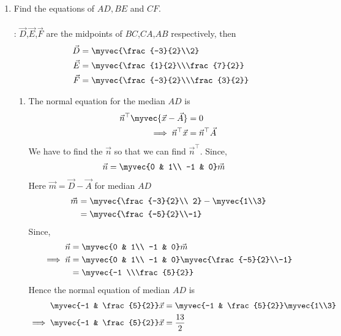 \documentclass[11pt]{book}
\begin{document}
\begin{enumerate}[label=\thesection.\arabic*.,ref=\thesection.\theenumi]
\item Find the equations of $AD, BE$ and $CF$.\\
\\ \solution:
$\vec{D}$,$\vec{E}$,$\vec{F}$ are the midpoints of $BC$,$CA$,$AB$ respectively, then\\
\begin{align}
 \vec{D} &=  \myvec{\frac{-3}{2}\\2}\\
\vec{E} &=  \myvec{\frac{1}{2}\\\frac{7}{2}}\\
 \vec{F} &=  \myvec{\frac{-3}{2}\\\frac{3}{2}}\\
\end{align}
\begin{enumerate}

 \item The normal equation for the median $AD$ is
  \begin{align}
    \vec{n}^{\top}\myvec{\vec{x}-\vec{A}}&=0\\
    \implies
    \vec{n}^{\top}\vec{x}&=\vec{n}^{\top}\vec{A}
  \end{align}
 We have to find the $\vec{n}$ so that we can find $\vec{n}^{\top}$.
 Since,
\begin{align}
  \vec{n} &= \myvec{0 & 1\\
  -1 & 0}\vec{m}
\end{align}
Here $\vec{m} = \vec{D}- \vec{A}$ for median $AD$
\begin{align}
\vec{m}&=\myvec{\frac{-3}{2}\\ 2} - \myvec{1\\3}\\
       &=\myvec{\frac{-5}{2}\\-1}
\end{align}
Since,
\begin{align}
  \vec{n} &= \myvec{0 & 1\\
  -1 & 0}\vec{m}\\
\implies
\vec{n} &= \myvec{0 & 1\\
  -1 & 0}\myvec{\frac{-5}{2}\\-1}\\
        &= \myvec{-1 \\\frac{5}{2}}
\end{align}
Hence the normal equation of median $AD$ is 
\begin{align}
    \myvec{-1 & \frac{5}{2}}\vec{x}&=\myvec{-1 & \frac{5}{2}}\myvec{1\\3}\\
    \implies
    \myvec{-1 & \frac{5}{2}}\vec{x}&=\frac{13}{2}
\end{align}


\end{enumerate}
\end{enumerate}
\end{document}
